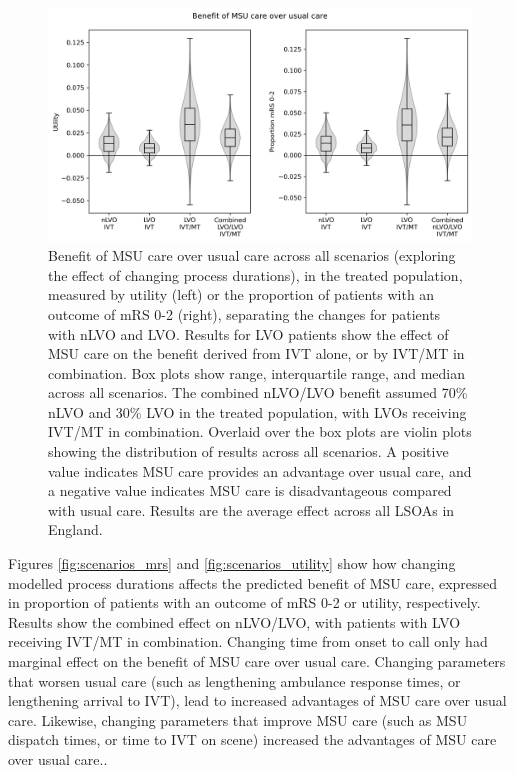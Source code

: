 \begin{figure}[h!]
    \centering
    \includegraphics[width=0.75\linewidth]{images/scenario_results_summary.png}
    \caption{Benefit of MSU care over usual care across all scenarios (exploring the effect of changing process durations), in the treated population, measured by utility (left) or the proportion of patients with an outcome of mRS 0-2 (right), separating the changes for patients with nLVO and LVO. Results for LVO patients show the effect of MSU care on the benefit derived from IVT alone, or by IVT/MT in combination. Box plots show range, interquartile range, and median across all scenarios. The combined nLVO/LVO benefit assumed 70\% nLVO and 30\% LVO in the treated population, with LVOs receiving IVT/MT in combination. Overlaid over the box plots are violin plots showing the distribution of results across all scenarios. A positive value indicates MSU care provides an advantage over usual care, and a negative value indicates MSU care is disadvantageous compared with usual care. Results are the average effect across all LSOAs in England.}
    \label{fig:scenarios_overview}
\end{figure}

Figures \ref{fig:scenarios_mrs}  and \ref{fig:scenarios_utility} show how changing modelled process durations affects the predicted benefit of MSU care, expressed in proportion of patients with an outcome of mRS 0-2 or utility, respectively. Results show the combined effect on nLVO/LVO, with patients with LVO receiving IVT/MT in combination. Changing time from onset to call only had marginal effect on the benefit of MSU care over usual care. Changing parameters that worsen usual care (such as lengthening ambulance response times, or lengthening arrival to IVT), lead to increased advantages of MSU care over usual care. Likewise, changing parameters that improve MSU care (such as MSU dispatch times, or time to IVT on scene) increased the advantages of MSU care over usual care..

